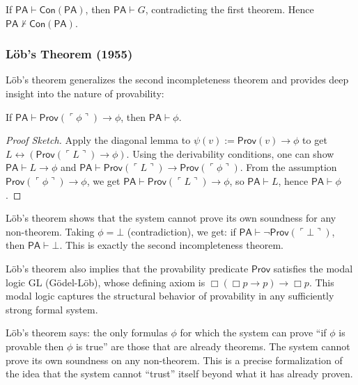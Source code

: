 If $\mathsf{PA} \vdash \mathsf{Con}(\mathsf{PA})$, then $\mathsf{PA} \vdash G$, contradicting the first theorem. Hence $\mathsf{PA} \nvdash \mathsf{Con}(\mathsf{PA})$.

\subsubsection*{Löb's Theorem (1955)}

Löb's theorem generalizes the second incompleteness theorem and provides deep insight into the nature of provability:

\begin{theorem}
If $\mathsf{PA} \vdash \mathsf{Prov}(\ulcorner \phi \urcorner) \to \phi$, then $\mathsf{PA} \vdash \phi$.
\end{theorem}

\begin{proof}[Proof Sketch]
Apply the diagonal lemma to $\psi(v) := \mathsf{Prov}(v) \to \phi$ to get $L \leftrightarrow (\mathsf{Prov}(\ulcorner L \urcorner) \to \phi)$. Using the derivability conditions, one can show $\mathsf{PA} \vdash L \to \phi$ and $\mathsf{PA} \vdash \mathsf{Prov}(\ulcorner L \urcorner) \to \mathsf{Prov}(\ulcorner \phi \urcorner)$. From the assumption $\mathsf{Prov}(\ulcorner \phi \urcorner) \to \phi$, we get $\mathsf{PA} \vdash \mathsf{Prov}(\ulcorner L \urcorner) \to \phi$, so $\mathsf{PA} \vdash L$, hence $\mathsf{PA} \vdash \phi$.
\end{proof}

Löb's theorem shows that the system cannot prove its own soundness for any non-theorem. Taking $\phi = \bot$ (contradiction), we get: if $\mathsf{PA} \vdash \neg \mathsf{Prov}(\ulcorner \bot \urcorner)$, then $\mathsf{PA} \vdash \bot$. This is exactly the second incompleteness theorem.

Löb's theorem also implies that the provability predicate $\mathsf{Prov}$ satisfies the modal logic GL (Gödel-Löb), whose defining axiom is $\Box(\Box p \to p) \to \Box p$. This modal logic captures the structural behavior of provability in any sufficiently strong formal system.

Löb's theorem says: the only formulas $\phi$ for which the system can prove ``if $\phi$ is provable then $\phi$ is true'' are those that are already theorems. The system cannot prove its own soundness on any non-theorem. This is a precise formalization of the idea that the system cannot ``trust'' itself beyond what it has already proven.

